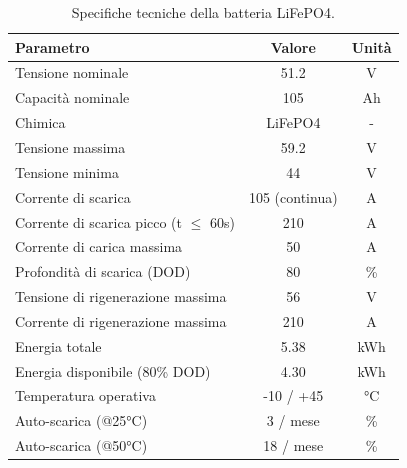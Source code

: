 \begin{table}[htbp]
    \centering
    \caption{Specifiche tecniche della batteria LiFePO4.}
    \label{tab:battery_specs}
    \begin{tabular}{|l|c|c|}
        \hline
        \textbf{Parametro}                       & \textbf{Valore} & \textbf{Unità} \\
        \hline
        Tensione nominale                        & 51.2            & V              \\
        Capacità nominale                        & 105             & Ah             \\
        Chimica                                  & LiFePO4         & -              \\
        Tensione massima                         & 59.2            & V              \\
        Tensione minima                          & 44              & V              \\
        Corrente di scarica                      & 105 (continua)  & A              \\
        Corrente di scarica picco (t $\leq$ 60s) & 210             & A              \\
        Corrente di carica massima               & 50              & A              \\
        Profondità di scarica (DOD)              & 80              & \%             \\
        Tensione di rigenerazione massima        & 56              & V              \\
        Corrente di rigenerazione massima        & 210             & A              \\
        Energia totale                           & 5.38            & kWh            \\
        Energia disponibile (80\% DOD)           & 4.30            & kWh            \\
        Temperatura operativa                    & -10 / +45       & °C             \\
        Auto-scarica (@25°C)                     & 3 / mese        & \%             \\
        Auto-scarica (@50°C)                     & 18 / mese       & \%             \\
        \hline
    \end{tabular}
\end{table}


